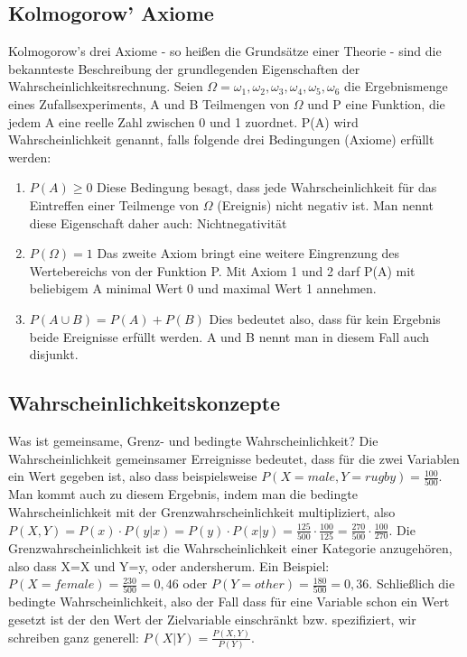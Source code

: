 \documentclass[letterpaper, titlepage]{article}
\begin{document}
\subsection{Kolmogorow' Axiome}\label{Kolmogorow's Axiome}
Kolmogorow's drei Axiome - so heißen die Grundsätze einer Theorie - sind die bekannteste Beschreibung der grundlegenden Eigenschaften der Wahrscheinlichkeitsrechnung. Seien $\Omega={\omega_1, \omega_2, \omega_3, \omega_4, \omega_5, \omega_6}$ die Ergebnismenge eines Zufallsexperiments, A und B Teilmengen von $\Omega$ und P eine Funktion, die jedem A eine reelle Zahl zwischen 0 und 1 zuordnet. P(A) wird Wahrscheinlichkeit genannt, falls folgende drei Bedingungen (Axiome) erfüllt werden:
\begin{enumerate}
    \item $P(A)\geq0$ Diese Bedingung besagt, dass jede Wahrscheinlichkeit für das Eintreffen einer Teilmenge von $\Omega$ (Ereignis) nicht negativ ist. Man nennt diese Eigenschaft daher auch: Nichtnegativität
    \item $P(\Omega)=1$ Das zweite Axiom bringt eine weitere Eingrenzung des Wertebereichs von der Funktion P. Mit Axiom 1 und 2 darf P(A) mit beliebigem A minimal Wert 0 und maximal Wert 1 annehmen.
    \item $P(A \cup B)=P(A)+P(B)$ Dies bedeutet also, dass für kein Ergebnis beide Ereignisse erfüllt werden. A und B nennt man in diesem Fall auch disjunkt.
\end{enumerate}

\subsection{Wahrscheinlichkeitskonzepte}\label{Wahrscheinlichkeitskonzepte}
Was ist gemeinsame, Grenz- und bedingte Wahrscheinlichkeit? Die Wahrscheinlichkeit gemeinsamer Erreignisse bedeutet, dass für die zwei Variablen ein Wert gegeben ist, also dass beispielsweise $P(X=male, Y=rugby)=\frac{100}{500}$. Man kommt auch zu diesem Ergebnis, indem man die bedingte Wahrscheinlichkeit mit der  Grenzwahrscheinlichkeit multipliziert, also $P(X,Y)=P(x)\cdot P(y|x)=P(y)\cdot P(x|y)=\frac{125}{500}\cdot \frac{100}{125}=\frac{270}{500}\cdot \frac{100}{270}$. Die  Grenzwahrscheinlichkeit ist die Wahrscheinlichkeit einer Kategorie anzugehören, also dass X=X und Y=y, oder andersherum. Ein Beispiel: $P(X=female)=\frac{230}{500}=0,46$ oder $P(Y=other)=\frac{180}{500}=0,36$. Schließlich die bedingte Wahrscheinlichkeit, also der Fall dass für eine Variable schon ein Wert gesetzt ist der den Wert der Zielvariable einschränkt bzw. spezifiziert, wir schreiben ganz generell: $P(X|Y)=\frac{P(X,Y)}{P(Y)}$.
\end{document}
